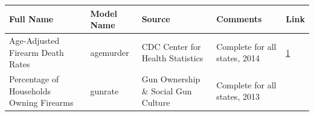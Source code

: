 \documentclass[floatsintext,mask,man]{apa6}
\theoremstyle{definition}
\theoremstyle{definition}
\theoremstyle{definition}
\theoremstyle{remark}
\begin{document}
\begin{longtable}[]{@{}lllll@{}}
\toprule
\begin{minipage}[b]{0.29\columnwidth}\raggedright\strut
Full Name\strut
\end{minipage} & \begin{minipage}[b]{0.09\columnwidth}\raggedright\strut
Model Name\strut
\end{minipage} & \begin{minipage}[b]{0.22\columnwidth}\raggedright\strut
Source\strut
\end{minipage} & \begin{minipage}[b]{0.22\columnwidth}\raggedright\strut
Comments\strut
\end{minipage} & \begin{minipage}[b]{0.04\columnwidth}\raggedright\strut
Link\strut
\end{minipage}\tabularnewline
\midrule
\endhead
\begin{minipage}[t]{0.29\columnwidth}\raggedright\strut
Age-Adjusted Firearm Death Rates\strut
\end{minipage} & \begin{minipage}[t]{0.09\columnwidth}\raggedright\strut
agemurder\strut
\end{minipage} & \begin{minipage}[t]{0.22\columnwidth}\raggedright\strut
CDC Center for Health Statistics\strut
\end{minipage} & \begin{minipage}[t]{0.22\columnwidth}\raggedright\strut
Complete for all states, 2014\strut
\end{minipage} & \begin{minipage}[t]{0.04\columnwidth}\raggedright\strut
\href{https://www.cdc.gov/nchs/pressroom/sosmap/firearm.htm}{1}\strut
\end{minipage}\tabularnewline
\begin{minipage}[t]{0.29\columnwidth}\raggedright\strut
Percentage of Households Owning Firearms\strut
\end{minipage} & \begin{minipage}[t]{0.09\columnwidth}\raggedright\strut
gunrate\strut
\end{minipage} & \begin{minipage}[t]{0.22\columnwidth}\raggedright\strut
Gun Ownership \& Social Gun Culture\strut
\end{minipage} & \begin{minipage}[t]{0.22\columnwidth}\raggedright\strut
Complete for all states, 2013\strut

\end{minipage}
\end{longtable}
\end{document}
